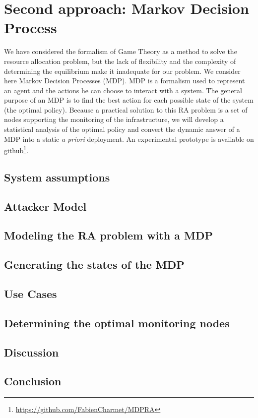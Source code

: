 \section{Second approach: Markov Decision Process}
We have considered the formalism of Game Theory as a method to solve the resource allocation problem, but the lack of flexibility and the complexity of determining the equilibrium make it inadequate for our problem. We consider here Markov Decision Processes (MDP).
MDP is a formalism used to represent an agent and the actions he can choose to interact with a system. The general purpose of an MDP is to find the best action for each possible state of the system (\ie the optimal policy). Because a practical solution to this RA problem is a set of nodes supporting the monitoring of the infrastructure, we will develop a statistical analysis of the optimal policy and convert the dynamic answer of a MDP into a static \textit{a priori} deployment.
An experimental prototype is available on github\footnote{\label{github}\url{https://github.com/FabienCharmet/MDPRA}}.


% 



\subsection{System assumptions}


\subsection{Attacker Model}


\subsection{Modeling the RA problem with a MDP}


\newpage
\subsection{Generating the states of the MDP}
 

\newpage
\subsection{Use Cases}


\subsection{Determining the optimal monitoring nodes}


\subsection{Discussion}


\subsection{Conclusion}
